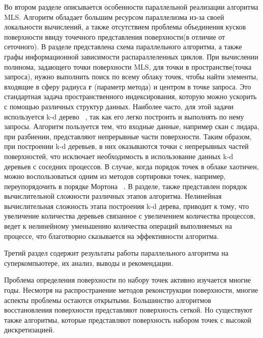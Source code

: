 Во втором разделе описывается особенности параллельной реализации алгоритма MLS. Алгоритм обладает большим ресурсом параллелизма из-за своей локальности вычислений, а также отсутствием проблемы объединения кусков поверхности ввиду точечного представления поверхности(в отличие от сеточного). В разделе представлена схема параллельного алгоритма, а также графы информационной зависимости распараллеленных циклов. При вычислении полинома, задающего точки поверхности MLS, для точки в пространстве(точка запроса), нужно выполнить поиск по всему облаку точек, чтобы найти элементы, входящие в сферу радиуса \textbf{r} (параметр метода) и центром в точке запроса. Это стандартная задача пространственного индексирования, которую можно ускорить с помощью различных структур данных. Наиболее часто, для этой задачи используется k-d дерево ~\cite{Russell}, так как его легко построить и выполнять по нему запросы. Алгоритм пользуется тем, что входные данные, например скан с лидара, при разбиении, представляют непрерывные части поверхности. Таким образом, при построении k-d деревьев, в них оказываются точки с непрерывных частей поверхностей, что исключает необходимость в использование данных k-d деревьев с соседних процессов. В случае, когда порядок точек в облаке хаотичен, можно воспользоваться одним из методов сортировки точек, например, переупорядочить в порядке Мортона ~\cite{MORTON}. В разделе, также представлен порядок вычислительной сложности различных этапов алгоритма. Нелинейная вычислительная сложность этапа построения k-d дерева, приводит к тому, что увеличение количества деревьев связанное с увеличением количества процессов, ведет к нелинейному уменьшению количества операций выполняемых на процессе, что благотворно сказывается на эффективности алгоритма.

Третий раздел содержит результаты работы параллельного алгоритма на суперкомпьютере, их анализ, выводы и рекомендации.




Проблема определения поверхности по набору точек активно изучается многие годы. Несмотря на распространение методов реконструкции поверхности, многие аспекты проблемы остаются открытыми. Большинство алгоритмов восстановления поверхности представляют поверхность сеткой. Но существуют также алгоритмы, которые представляют поверхность набором точек с высокой дискретизацией.

